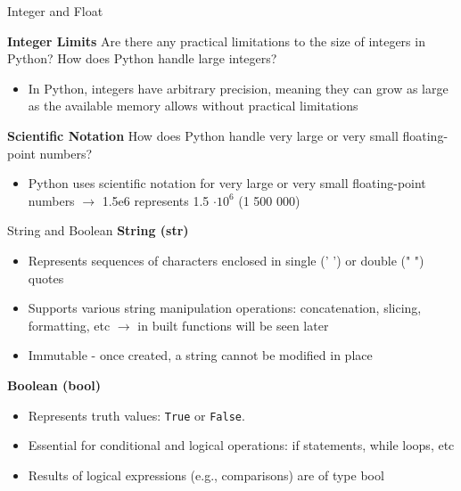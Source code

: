 \documentclass[
	11pt, 
]{beamer}
\begin{document}
\begin{frame}[fragile]{Integer and Float}

\begin{block}{\textbf{Integer Limits}}
 Are there any practical limitations to the size of integers in Python? How does Python handle large integers?
\end{block}
\pause
\begin{itemize}
    \item In Python, integers have arbitrary precision, meaning they can grow as large as the available memory allows without practical limitations
\end{itemize}

\begin{block}{\textbf{Scientific Notation}}
 How does Python handle very large or very small floating-point numbers?
\end{block}
\pause
\begin{itemize}
    \item Python uses scientific notation for very large or very small floating-point numbers $\rightarrow$ 1.5e6 represents 1.5 $ \cdot 10^{6}$ (1 500 000)
\end{itemize}


\end{frame}


\begin{frame}{String and Boolean}
\textbf{String (str)}
    \begin{itemize}
        \item Represents sequences of characters enclosed in single (' ') or double (" ") quotes 
        \item Supports various string manipulation operations: concatenation, slicing, formatting, etc $\rightarrow$ in built functions will be seen later
        \item Immutable - once created, a string cannot be modified in place
    \end{itemize}


\textbf{Boolean (bool)}
    \begin{itemize}
        \item Represents truth values: \texttt{True} or \texttt{False}.
        \item Essential for conditional and logical operations: if statements, while loops, etc
        \item Results of logical expressions (e.g., comparisons) are of type bool
    \end{itemize}

\end{frame}
\end{document}
